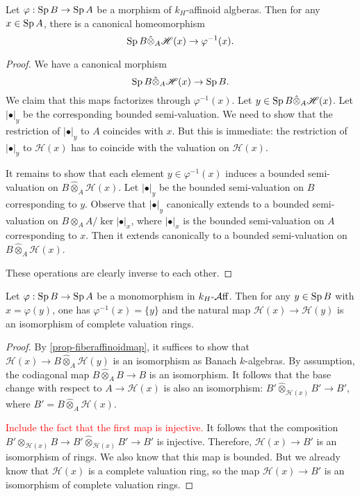 \begin{proposition}\label{prop-fiberaffinoidmap}
    Let $\varphi:\operatorname{Sp} B\rightarrow \operatorname{Sp} A$ be a morphism of $k_H$-affinoid algberas. Then for any $x\in \operatorname{Sp} A$, there is a canonical homeomorphism
    \[
        \operatorname{Sp} B\hat{\otimes}_A \mathscr{H}(x)\rightarrow \varphi^{-1}(x).  
    \]
\end{proposition}
\begin{proof}
    We have a canonical morphism 
    \[
        \operatorname{Sp}  B\hat{\otimes}_A \mathscr{H}(x)\rightarrow \operatorname{Sp} B.
    \]
    We claim that this maps factorizes through $\varphi^{-1}(x)$. Let $y\in \operatorname{Sp} B\hat{\otimes}_A \mathscr{H}(x)$. Let $|\bullet|_y$ be the corresponding bounded semi-valuation. We need to show that the restriction of $|\bullet|_y$ to $A$ coincides with $x$. But this is immediate: the restriction of $|\bullet|_y$ to $\mathscr{H}(x)$ has to coincide with the valuation on $\mathscr{H}(x)$.

    It remains to show that each element $y\in \varphi^{-1}(x)$ induces a bounded semi-valuation on $B\hat{\otimes}_A \mathscr{H}(x)$. Let $|\bullet|_y$ be  the bounded semi-valuation on $B$ corresponding to $y$. Observe that $|\bullet|_y$ canonically extends to a bounded semi-valuation on $B\otimes_A A/\ker|\bullet|_x$, where $|\bullet|_x$ is the bounded semi-valuation on $A$ corresponding to $x$. Then it extends canonically to a bounded semi-valuation on  $B\hat{\otimes}_A \mathscr{H}(x)$. 

    These operations are clearly inverse to each other.
\end{proof}



\begin{proposition}\label{prop-monoaffinj}
    Let $\varphi:\operatorname{Sp} B\rightarrow \operatorname{Sp} A$ be a monomorphism in $k_H\text{-}\mathcal{A}\mathrm{ff}$. Then for any $y\in \operatorname{Sp} B$ with $x=\varphi(y)$, one has $\varphi^{-1}(x)=\{y\}$ and the natural map $\mathscr{H}(x)\rightarrow \mathscr{H}(y)$ is an isomorphism of complete valuation rings.
\end{proposition}
\begin{proof}
    By \cref{prop-fiberaffinoidmap}, it suffices to show that $\mathscr{H}(x)\rightarrow B\hat{\otimes}_A \mathscr{H}(y)$ is an isomorphism as Banach $k$-algebras. By assumption, the codiagonal map $B\hat{\otimes}_A B\rightarrow B$ is an isomorphism. It follows that the base change with respect to $A\rightarrow \mathscr{H}(x)$ is also an isomorphism: $B'\hat{\otimes}_{\mathscr{H}(x)}B'\rightarrow B'$, where $B'=B\hat{\otimes}_A \mathscr{H}(x)$.

    \textcolor{red}{Include the fact that the first map is injective.}
    It follows that the composition $B'\otimes_{\mathscr{H}(x)}B\rightarrow B'\hat{\otimes}_{\mathscr{H}(x)}B'\rightarrow B'$ is injective.
    Therefore, $\mathscr{H}(x)\rightarrow B'$ is an isomorphism of rings.  We also know that this map is bounded.
    But we already know that $\mathscr{H}(x)$ is a complete valuation ring, so the map $\mathscr{H}(x)\rightarrow B'$ is an isomorphism of complete valuation rings.
\end{proof}

